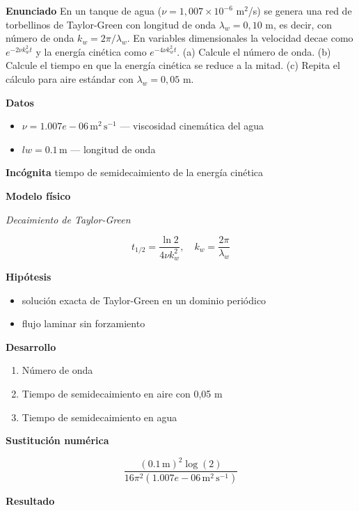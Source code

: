 \documentclass[10pt,openany]{book}
\begin{document}
\begin{tcolorbox}[title={Problema resuelto}, studiumworked, breakable]

\noindent\textbf{Enunciado}
En un tanque de agua (\(\nu = 1{,}007\times 10^{-6}\) m\(^2\)/s) se genera una red de torbellinos de Taylor-Green con longitud de onda \(\lambda_w = 0{,}10\) m, es decir, con número de onda \(k_w = 2\pi/\lambda_w\). En variables dimensionales la velocidad decae como \(e^{-2\nu k_w^{2} t}\) y la energía cinética como \(e^{-4\nu k_w^{2} t}\). (a) Calcule el número de onda. (b) Calcule el tiempo en que la energía cinética se reduce a la mitad. (c) Repita el cálculo para aire estándar con \(\lambda_w = 0{,}05\) m.

\noindent\textbf{Datos}
\begin{itemize}
\item $\nu = 1.007e-06\,\mathrm{m}^{2}\,\mathrm{s}^{-1}$ — viscosidad cinemática del agua
\item $lw = 0.1\,\mathrm{m}$ — longitud de onda
\end{itemize}

\noindent\textbf{Incógnita}
tiempo de semidecaimiento de la energía cinética

\noindent\textbf{Modelo físico}

\noindent\textit{Decaimiento de Taylor-Green}

\[
t_{1/2} = \frac{\ln 2}{4\nu k_w^{2}},\quad k_w = \frac{2\pi}{\lambda_w}
\]

\noindent\textbf{Hipótesis}
\begin{itemize}
\item solución exacta de Taylor-Green en un dominio periódico
\item flujo laminar sin forzamiento
\end{itemize}

\noindent\textbf{Desarrollo}
\begin{enumerate}
\item
Número de onda
\item
Tiempo de semidecaimiento en aire con 0,05 m
\item
Tiempo de semidecaimiento en agua
\end{enumerate}

\noindent\textbf{Sustitución numérica}

\[
\frac{\left(0.1\,\mathrm{m}\right)^{2} \log{\left(2 \right)}}{16 \pi^{2} \left(1.007e-06\,\mathrm{m}^{2}\,\mathrm{s}^{-1}\right)}
\]

\noindent\textbf{Resultado}


\end{tcolorbox}
\end{document}
